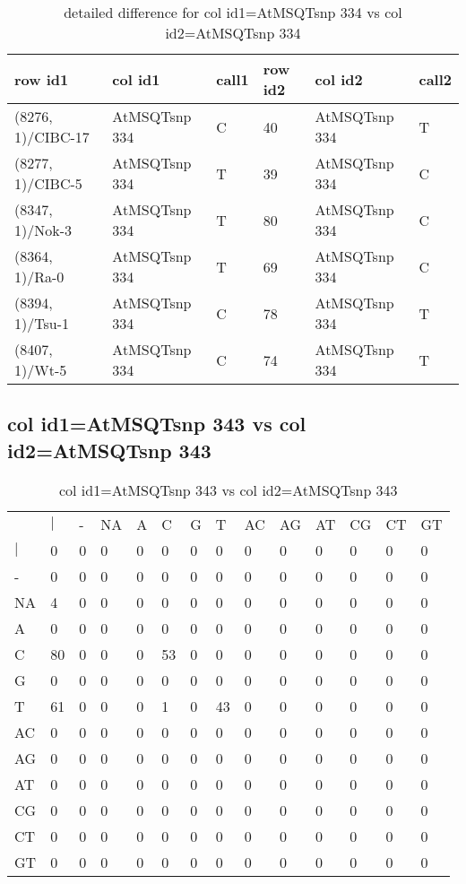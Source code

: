 \begin{center}
\begin{longtable}{|l|l|l|l|l|l|}
\caption{detailed difference for col id1=AtMSQTsnp 334 vs col id2=AtMSQTsnp 334} \label{table_dm667}\\
\hline
row id1&col id1&call1&row id2&col id2&call2\\
\hline
(8276, 1)/CIBC-17&AtMSQTsnp 334&C&40&AtMSQTsnp 334&T\\
(8277, 1)/CIBC-5&AtMSQTsnp 334&T&39&AtMSQTsnp 334&C\\
(8347, 1)/Nok-3&AtMSQTsnp 334&T&80&AtMSQTsnp 334&C\\
(8364, 1)/Ra-0&AtMSQTsnp 334&T&69&AtMSQTsnp 334&C\\
(8394, 1)/Tsu-1&AtMSQTsnp 334&C&78&AtMSQTsnp 334&T\\
(8407, 1)/Wt-5&AtMSQTsnp 334&C&74&AtMSQTsnp 334&T\\
\hline
\end{longtable}
\end{center}

\subsection{col id1=AtMSQTsnp 343 vs col id2=AtMSQTsnp 343}
\begin{center}
\begin{longtable}{|l|l|l|l|l|l|l|l|l|l|l|l|l|l|}
\caption{col id1=AtMSQTsnp 343 vs col id2=AtMSQTsnp 343} \label{table_dm668}\\
\hline
\\
\hline
&$|$&-&NA&A&C&G&T&AC&AG&AT&CG&CT&GT\\
$|$&0&0&0&0&0&0&0&0&0&0&0&0&0\\
-&0&0&0&0&0&0&0&0&0&0&0&0&0\\
NA&4&0&0&0&0&0&0&0&0&0&0&0&0\\
A&0&0&0&0&0&0&0&0&0&0&0&0&0\\
C&80&0&0&0&53&0&0&0&0&0&0&0&0\\
G&0&0&0&0&0&0&0&0&0&0&0&0&0\\
T&61&0&0&0&1&0&43&0&0&0&0&0&0\\
AC&0&0&0&0&0&0&0&0&0&0&0&0&0\\
AG&0&0&0&0&0&0&0&0&0&0&0&0&0\\
AT&0&0&0&0&0&0&0&0&0&0&0&0&0\\
CG&0&0&0&0&0&0&0&0&0&0&0&0&0\\
CT&0&0&0&0&0&0&0&0&0&0&0&0&0\\
GT&0&0&0&0&0&0&0&0&0&0&0&0&0\\
\hline
\end{longtable}
\end{center}

